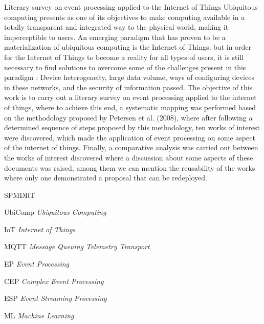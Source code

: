 \documentclass[ti,table]{texufpel} %
\begin{document}
\begin{englishabstract}%
  {Literary survey on event processing applied to the Internet of Things}
Ubiquitous computing presents as one of its objectives to make computing available in a totally transparent and integrated way to the physical world, making it imperceptible to users. An emerging paradigm that has proven to be a materialization of ubiquitous computing is the Internet of Things, but in order for the Internet of Things to become a reality for all types of users, it is still necessary to find solutions to overcome some of the challenges present in this paradigm : Device heterogeneity, large data volume, ways of configuring devices in these networks, and the security of information passed. The objective of this work is to carry out a literary survey on event processing applied to the internet of things, where to achieve this end, a systematic mapping was performed based on the methodology proposed by Petersen et al. (2008), where after following a determined sequence of steps proposed by this methodology, ten works of interest were discovered, which made the application of event processing on some aspect of the internet of things. Finally, a comparative analysis was carried out between the works of interest discovered where a discussion about some aspects of these documents was raised, among them we can mention the reusability of the works where only one demonstrated a proposal that can be redeployed.
\end{englishabstract}

\listoffigures


\begin{listofabbrv}{SPMDRT}
	
       
	\item[UbiComp] \textit{Ubiquitous Computing}
	\item[IoT] \textit{Internet of Things}
	\item[MQTT] \textit{Message Queuing Telemetry Transport}
	\item[EP] \textit{Event Processing}
	\item[CEP] \textit{Complex Event Processing}
	\item[ESP] \textit{Event Streaming Processing}
	\item[ML] \textit{Machine Learning}
        
\end{listofabbrv}
\end{document}
